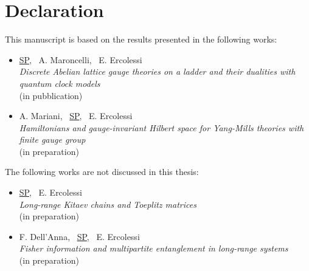 \chapter*{Declaration}


This manuscript is based on the results presented in the following works:

\begin{itemize}
    \frenchspacing
    \item
        \underline{SP}, ~A. Maroncelli, ~E. Ercolessi\\
        \emph{Discrete Abelian lattice gauge theories on a ladder and their dualities with quantum clock models}\\
         (in pubblication)

    \item
        A. Mariani, ~\underline{SP}, ~E. Ercolessi\\
        \emph{Hamiltonians and gauge-invariant Hilbert space for Yang-Mills theories with finite gauge group }\\
        (in preparation)
    \nonfrenchspacing
\end{itemize}

\vspace*{1cm}

\noindent The following works are not discussed in this thesis:

\begin{itemize}
    \frenchspacing
    \item
        \underline{SP}, ~E. Ercolessi\\
        \emph{Long-range Kitaev chains and Toeplitz matrices} \\
        (in preparation)

    \item
        F. Dell'Anna, ~\underline{SP}, ~E. Ercolessi\\
        \emph{Fisher information and multipartite entanglement in long-range systems}\\
        (in preparation)

    \nonfrenchspacing
\end{itemize}

\cleardoublepage
